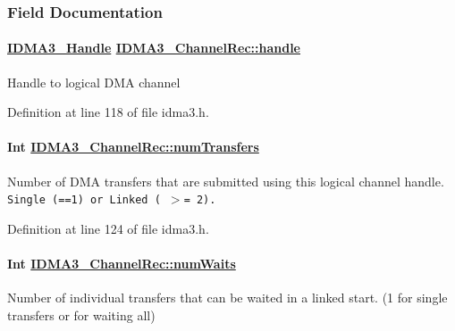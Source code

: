 \subsubsection{Field Documentation}
\hypertarget{struct_i_d_m_a3___channel_rec_5632bb9719d49836987e3b4ae9b3d692}{
\paragraph[handle]{\setlength{\rightskip}{0pt plus 5cm}\hyperlink{struct_i_d_m_a3___obj}{IDMA3\_\-Handle} \hyperlink{struct_i_d_m_a3___channel_rec_5632bb9719d49836987e3b4ae9b3d692}{IDMA3\_\-Channel\-Rec::handle}}\hfill}
\label{struct_i_d_m_a3___channel_rec_5632bb9719d49836987e3b4ae9b3d692}


Handle to logical DMA channel 

Definition at line 118 of file idma3.h.\hypertarget{struct_i_d_m_a3___channel_rec_725990b773355d1dfd5fc9af66179d22}{
\paragraph[numTransfers]{\setlength{\rightskip}{0pt plus 5cm}Int \hyperlink{struct_i_d_m_a3___channel_rec_725990b773355d1dfd5fc9af66179d22}{IDMA3\_\-Channel\-Rec::num\-Transfers}}\hfill}
\label{struct_i_d_m_a3___channel_rec_725990b773355d1dfd5fc9af66179d22}


Number of DMA transfers that are submitted using this logical channel handle. {\tt Single (==1) or Linked ( $>$= 2).} 

Definition at line 124 of file idma3.h.\hypertarget{struct_i_d_m_a3___channel_rec_9be5abbc86b57d28e1d65cc6ea1ed294}{
\paragraph[numWaits]{\setlength{\rightskip}{0pt plus 5cm}Int \hyperlink{struct_i_d_m_a3___channel_rec_9be5abbc86b57d28e1d65cc6ea1ed294}{IDMA3\_\-Channel\-Rec::num\-Waits}}\hfill}
\label{struct_i_d_m_a3___channel_rec_9be5abbc86b57d28e1d65cc6ea1ed294}


Number of individual transfers that can be waited in a linked start. (1 for single transfers or for waiting all) 

